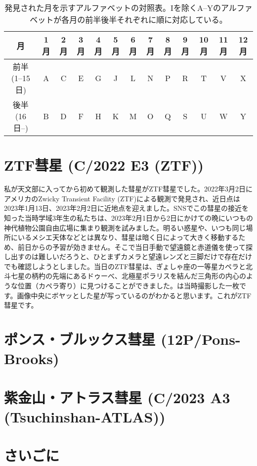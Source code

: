 \documentclass[../../super_nova_2024]{subfiles}
\begin{document}
\begin{table}
    \centering
    \caption{発見された月を示すアルファベットの対照表。Iを除くA--Yのアルファベットが各月の前半後半それぞれに順に対応している。}
    \label{tab:alphabet}
    \begin{tabular}{c|cccccccccccc}\hline
        月 & 1月 & 2月 & 3月 & 4月 & 5月 & 6月 & 7月 & 8月 & 9月 & 10月 & 11月 & 12月 \\
        \hline
        前半(1--15日) & A & C & E & G & J & L & N & P & R & T & V & X \\
        後半(16日--) & B & D & F & H & K & M & O & Q & S & U & W & Y \\
        \hline
    \end{tabular}
\end{table}


\section{ZTF彗星 (C/2022 E3 (ZTF))}

私が天文部に入ってから初めて観測した彗星がZTF彗星でした。2022年3月2日にアメリカのZwicky Transient Facility (ZTF)による観測で発見され、近日点は2023年1月13日、2023年2月2日に近地点を迎えました。SNSでこの彗星の接近を知った当時学域3年生の私たちは、2023年2月1日から2日にかけての晩にいつもの神代植物公園自由広場に集まり観測を試みました。明るい惑星や、いつも同じ場所にいるメシエ天体などとは異なり、彗星は暗く日によって大きく移動するため、前日からの予習が効きません。そこで当日手動で望遠鏡と赤道儀を使って探し出すのは難しいだろうと、ひとまずカメラと望遠レンズと三脚だけで存在だけでも確認しようとしました。当日のZTF彗星は、ぎょしゃ座の一等星カペラと北斗七星の柄杓の先端にあるドゥーべ、北極星ポラリスを結んだ三角形の内心のような位置（カペラ寄り）に見つけることができました。は当時撮影した一枚です。画像中央にボヤッとした星が写っているのがわかると思います。これがZTF彗星です。

\section{ポンス・ブルックス彗星 (12P/Pons-Brooks)}



\section{紫金山・アトラス彗星 (C/2023 A3 (Tsuchinshan-ATLAS))}



\section{さいごに}
\end{document}
